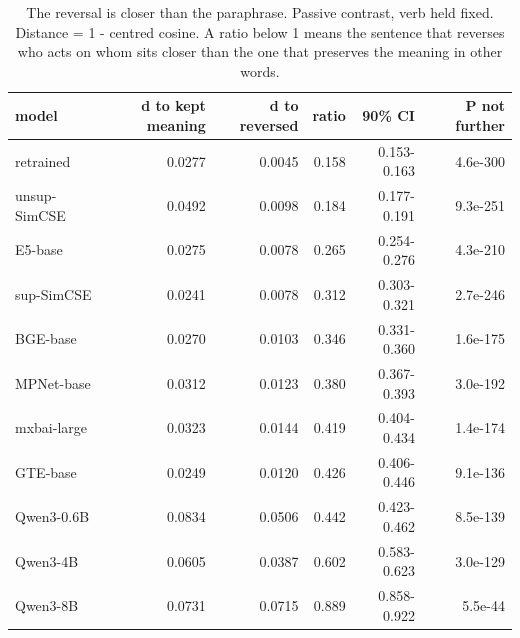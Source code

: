 \begin{table}[t]
\centering
\small
\caption{The reversal is closer than the paraphrase. Passive contrast, verb held fixed. Distance = 1 - centred cosine. A ratio below 1 means the sentence that reverses who acts on whom sits closer than the one that preserves the meaning in other words.}
\begin{tabular}{lrrrrr}
\toprule
model & d to kept meaning & d to reversed & ratio & 90\% CI & P not further \\
\midrule
retrained & 0.0277 & 0.0045 & 0.158 & 0.153-0.163 & 4.6e-300 \\
unsup-SimCSE & 0.0492 & 0.0098 & 0.184 & 0.177-0.191 & 9.3e-251 \\
E5-base & 0.0275 & 0.0078 & 0.265 & 0.254-0.276 & 4.3e-210 \\
sup-SimCSE & 0.0241 & 0.0078 & 0.312 & 0.303-0.321 & 2.7e-246 \\
BGE-base & 0.0270 & 0.0103 & 0.346 & 0.331-0.360 & 1.6e-175 \\
MPNet-base & 0.0312 & 0.0123 & 0.380 & 0.367-0.393 & 3.0e-192 \\
mxbai-large & 0.0323 & 0.0144 & 0.419 & 0.404-0.434 & 1.4e-174 \\
GTE-base & 0.0249 & 0.0120 & 0.426 & 0.406-0.446 & 9.1e-136 \\
Qwen3-0.6B & 0.0834 & 0.0506 & 0.442 & 0.423-0.462 & 8.5e-139 \\
Qwen3-4B & 0.0605 & 0.0387 & 0.602 & 0.583-0.623 & 3.0e-129 \\
Qwen3-8B & 0.0731 & 0.0715 & 0.889 & 0.858-0.922 & 5.5e-44 \\
\bottomrule
\end{tabular}
\end{table}
